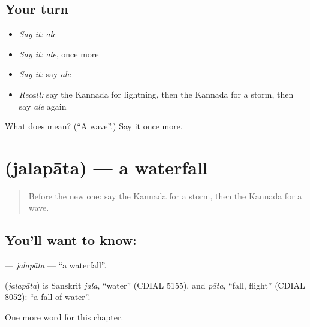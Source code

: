 \subsection*{Your turn}
\begin{itemize}
\raggedright
  \item \emph{Say it:} \emph{ale}
  \item \emph{Say it:} \emph{ale}, once more
  \item \emph{Say it:} say \emph{ale}
  \item \emph{Recall:} say the Kannada for lightning, then the Kannada for a storm, then say \emph{ale} again
\end{itemize}

\begin{tcolorbox}[breakable,colback=teal!4,colframe=teal!35!black,title={Before you move on}]
What does  mean? (\textquotedblleft{}A wave\textquotedblright{}.) Say it once more.
\end{tcolorbox}
\section[\texorpdfstring{\kn{ಜಲಪಾತ} (jalapāta)}{ಜಲಪಾತ (jalapāta)}]{ (jalapāta) — a waterfall}

\label{lesson:KA-C128-jalapata}



\begin{quote}
Before the new one: say the Kannada for a storm, then the Kannada for a wave.
\end{quote}

\subsection*{You'll want to know: }
\textbf{} — \emph{jalapāta} — \textquotedblleft{}a waterfall\textquotedblright{}.

\begin{cousinweb}
\textbf{} (\emph{jalapāta}) is Sanskrit \emph{jala}, \textquotedblleft{}water\textquotedblright{} (CDIAL 5155), and \emph{pāta}, \textquotedblleft{}fall, flight\textquotedblright{} (CDIAL 8052): \textquotedblleft{}a fall of water\textquotedblright{}.
\end{cousinweb}

\begin{grammarlens}[title={What you've built}]
One more word for this chapter.
\end{grammarlens}

